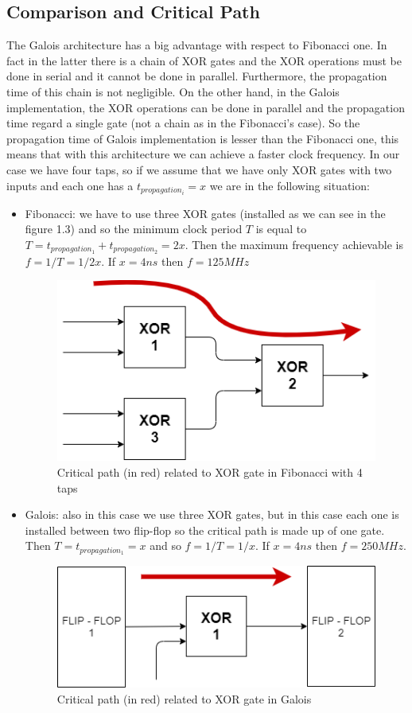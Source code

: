 \documentclass[a4paper]{report}
\begin{document}
\subsection{Comparison and Critical Path}
The Galois architecture has a big advantage with respect to Fibonacci one. In fact in the latter there is a chain of XOR gates and the XOR operations must be done in serial and it cannot be done in parallel. Furthermore, the propagation time of this chain is not negligible. On the other hand, in the Galois implementation, the XOR operations can be done in parallel and the propagation time regard a single gate (not a chain as in the Fibonacci's case). So the propagation time of Galois implementation is lesser than the Fibonacci one, this means that with this architecture we can achieve a faster clock frequency.
In our case we have four taps, so if we assume that we have only XOR gates with two inputs and each one has a $t_{propagation_{i}} = x$ we are in the following situation:
	\begin{itemize}
		\item Fibonacci: we have to use three XOR gates (installed as we can see in the figure 1.3) and so the minimum clock period $T$ is equal to $T = t_{propagation_{1}} + t_{propagation_{2}} = 2x$. Then the maximum frequency achievable is $f=1/T=1/2x$. If $x=4ns$ then $f = 125 MHz$
		\begin{figure}[htpb]
			\centering
			\includegraphics[scale=0.5]{img/XOR chain.png}
			\caption{Critical path (in red) related to XOR gate in Fibonacci with 4 taps}
		\end{figure}
		\item Galois: also in this case we use three XOR gates, but in this case each one is installed between two flip-flop so the critical path is made up of one gate. Then $T = t_{propagation_{1}} =x$ and so $f = 1/T = 1/x$. If $x=4ns$ then $f = 250 MHz$.
			\begin{figure}[htpb]
			\centering
			\includegraphics[scale=0.5]{img/XORtp.png}
			\caption{Critical path (in red) related to XOR gate in Galois}
		\end{figure}
	\end{itemize}
\end{document}
